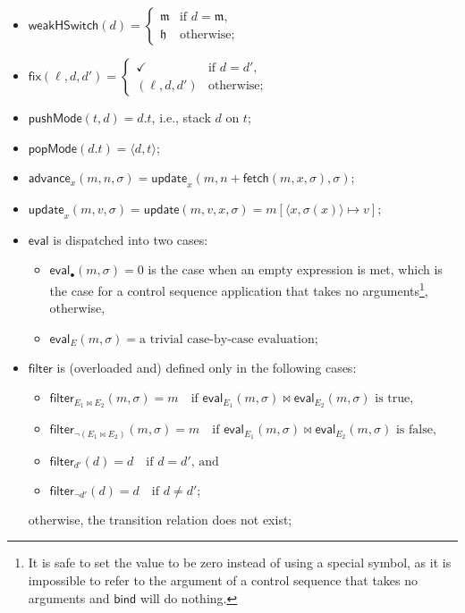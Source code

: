 \documentclass[a4paper]{article}
\newcommand*{\mode}[1]{\mathfrak{#1}}
\newcommand*{\weakhsw}{\mathsf{weakHSwitch}}
\newcommand*{\fix}[3]{\mathsf{fix}(#1, #2, #3)}
\newcommand*{\update}{\mathsf{update}}
\newcommand*{\Advance}{\mathsf{advance}}
\newcommand*{\eval}{\mathsf{eval}}
\newcommand*{\fetch}{\mathsf{fetch}}
\newcommand*{\filter}{\mathsf{filter}}
\newcommand*{\pushMode}{\mathsf{pushMode}}
\newcommand*{\popMode}{\mathsf{popMode}}
\newcommand*{\bind}{\mathsf{bind}}
\begin{document}
\begin{itemize}
\item $\weakhsw(d) =
  \begin{cases}
    \mode{m} &\text{if $d = \mode{m}$,}\\
    \mode{h} &\text{otherwise;}
  \end{cases}$
\item $\fix{\ell}{d}{d'} =
  \begin{cases}
    \checkmark &\text{if $d = d'$,}\\
    (\ell, d, d') &\text{otherwise;}
  \end{cases}$
\item $\pushMode(t, d) = d.t$, i.e., stack $d$ on $t$;
\item $\popMode(d.t) = \langle d, t \rangle$;
\item $\Advance_x(m, n, \sigma) = \update_x(m, n + \fetch(m, x, \sigma), \sigma)$;
\item $\update_x(m, v, \sigma) = \update(m, v, x, \sigma) = m[\langle x, \sigma(x) \rangle \mapsto v]$;
\item $\eval$ is dispatched into two cases:
  \begin{itemize}
  \item $\eval_{\bullet}(m, \sigma) = 0$ is the case when an empty expression is met, which is the case for a control sequence application that takes no arguments\footnote{It is safe to set the value to be zero instead of using a special symbol, as it is impossible to refer to the argument of a control sequence that takes no arguments and $\bind$ will do nothing.}, otherwise,
  \item $\eval_E(m, \sigma) = \text{a trivial case-by-case evaluation;}$
  \end{itemize}
\item $\filter$ is (overloaded and) defined only in the following cases:
  \begin{itemize}
  \item $\filter_{E_1 \bowtie E_2}(m, \sigma) = m \quad\text{if $\eval_{E_1}(m, \sigma) \bowtie \eval_{E_2}(m, \sigma)$ is true,}$
  \item $\filter_{\neg(E_1 \bowtie E_2)}(m, \sigma) = m \quad\text{if $\eval_{E_1}(m, \sigma) \bowtie \eval_{E_2}(m, \sigma)$ is false,}$
  \item $\filter_{d'}(d) = d \quad\text{if $d = d'$, and}$
  \item $\filter_{\neg d'}(d) = d \quad\text{if $d \ne d'$;}$
  \end{itemize}
  otherwise, the transition relation does not exist;

\end{itemize}
\end{document}
